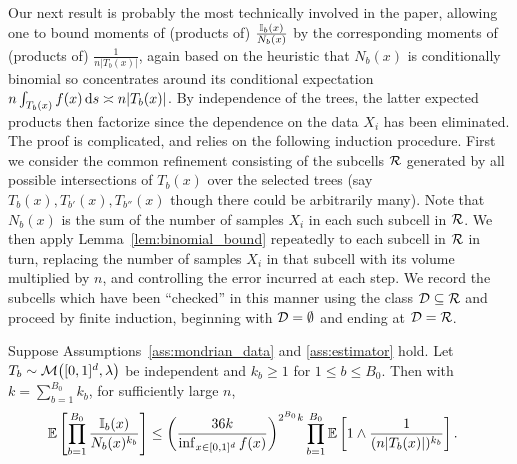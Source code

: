 Our next result is probably the most technically involved in the paper,
allowing one to bound moments of
(products of) $\frac{\mathbb{I}_b(x)}{N_b(x)}$ by the corresponding moments of
(products of) $\frac{1}{n |T_b(x)|}$, again based on the heuristic
that $N_b(x)$ is conditionally binomial so concentrates around
its conditional expectation
$n \int_{T_b(x)} f(x) \,\mathrm{d}s \asymp n |T_b(x)|$.
By independence of the trees,
the latter expected products then factorize
since the dependence on the data $X_i$ has been eliminated.
The proof is complicated, and relies on the following induction procedure.
First we consider the common refinement consisting of the
subcells $\mathcal{R}$ generated by all possible intersections
of $T_b(x)$ over the selected trees
(say $T_{b}(x), T_{b'}(x), T_{b''}(x)$
though there could be arbitrarily many).
Note that $N_b(x)$ is the sum of the number of
samples $X_i$ in each such subcell in $\mathcal{R}$.
We then apply Lemma~\ref{lem:binomial_bound} repeatedly
to each subcell in $\mathcal{R}$ in turn, replacing
the number of samples $X_i$ in that subcell with its volume
multiplied by $n$, and controlling the error incurred at each step.
We record the subcells which have been ``checked'' in this manner
using the class $\mathcal{D} \subseteq \mathcal{R}$ and proceed by finite induction,
beginning with $\mathcal{D} = \emptyset$ and ending at $\mathcal{D} = \mathcal{R}$.

\begin{lemma}%
  \label{lem:moment_denominator}

  Suppose Assumptions~\ref{ass:mondrian_data}
  and \ref{ass:estimator} hold.
  Let $T_b \sim \mathcal{M}\big([0,1]^d, \lambda\big)$
  be independent and $k_b \geq 1$ for $1 \leq b \leq B_0$.
  Then with $k = \sum_{b=1}^{B_0} k_b$,
  for sufficiently large $n$,
  \begin{align*}
    \mathbb{E}\left[
      \prod_{b=1}^{B_0}
      \frac{\mathbb{I}_b(x)}{N_b(x)^{k_b}}
    \right]
    &\leq
    \left( \frac{36k}{\inf_{x \in [0,1]^d} f(x)} \right)^{2^{B_0} k}
    \prod_{b=1}^{B_0}
    \mathbb{E} \left[
      1 \wedge
      \frac{1}{(n |T_b(x)|)^{k_b}}
    \right].
  \end{align*}
\end{lemma}

